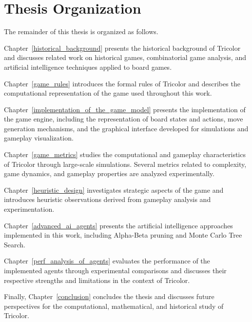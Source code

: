 \section{Thesis Organization}

The remainder of this thesis is organized as follows.

Chapter~\ref{historical_background} presents the historical background of Tricolor and discusses related work on historical games, combinatorial game analysis, and artificial intelligence techniques applied to board games.

Chapter~\ref{game_rules} introduces the formal rules of Tricolor and describes the computational representation of the game used throughout this work.

Chapter~\ref{implementation_of_the_game_model} presents the implementation of the game engine, including the representation of board states and actions, move generation mechanisms, and the graphical interface developed for simulations and gameplay visualization.

Chapter~\ref{game_metrics} studies the computational and gameplay characteristics of Tricolor through large-scale simulations. Several metrics related to complexity, game dynamics, and gameplay properties are analyzed experimentally.

Chapter~\ref{heuristic_design} investigates strategic aspects of the game and introduces heuristic observations derived from gameplay analysis and experimentation.

Chapter~\ref{advanced_ai_agents} presents the artificial intelligence approaches implemented in this work, including Alpha-Beta pruning and Monte Carlo Tree Search.

Chapter~\ref{perf_analysis_of_agents} evaluates the performance of the implemented agents through experimental comparisons and discusses their respective strengths and limitations in the context of Tricolor.

Finally, Chapter~\ref{conclusion} concludes the thesis and discusses future perspectives for the computational, mathematical, and historical study of Tricolor.